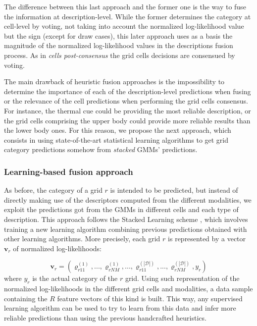 \documentclass[10pt,twocolumn,letterpaper]{article}
\begin{document}
The difference between this last approach and the former one is the way to fuse the information at description-level. While the former determines the category at cell-level by voting, not taking into account the normalized log-likelihood value but the sign (except for draw cases), this later approach uses as a basis the magnitude of the normalized log-likelihood values in the descriptions fusion process. As in \textit{cells post-consensus} the grid cells decisions are consensued by voting.

The main drawback of heuristic fusion approaches is the impossibility to determine the importance of each of the description-level predictions when fusing or the relevance of the cell predictions when performing the grid cells consensus. For instance, the thermal cue could be providing the most reliable description, or the grid cells comprising the upper body could provide more reliable results than the lower body ones. For this reason, we propose the next approach, which consists in using state-of-the-art statistical learning algorithms to get grid category predictions somehow from \textit{stacked} GMMs' predictions.

\subsubsection{Learning-based fusion approach}

As before, the category of a grid $r$ is intended to be predicted, but instead of directly making use of the descriptors computed from the different modalities, we exploit the predictions got from the GMMs in different cells and each type of description. This approach follows the Stacked Learning scheme \cite{cohen2005stacked, gatta2011multi}, which involves training a new learning algorithm combining previous predictions obtained with other learning algorithms. More precisely, each grid $r$ is represented by a vector $\mathbf{v}_r$ of normalized log-likelihoods:

$$\mathbf{v}_r = (\varrho_{r11}^{(1)}, ..., \varrho_{rNM}^{(1)}, ..., \varrho_{r11}^{(|\mathcal{D}|)}, ..., \varrho_{rNM}^{(|\mathcal{D}|)}, y_r)$$
where $y_r$ is the actual category of the $r$ grid. Using such representation of the normalized log-likelihoods in the different grid cells and modalities, a data sample containing the $R$ feature vectors of this kind is built. This way, any supervised learning algorithm can be used to try to learn from this data and infer more reliable predictions than using the previous handcrafted heuristics. 
\end{document}
